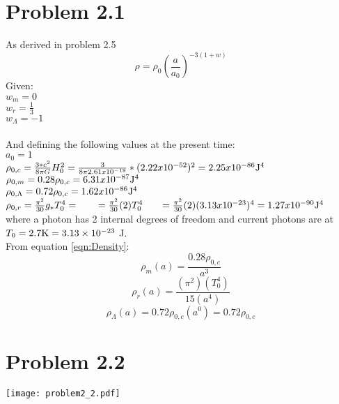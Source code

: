 \documentclass[11pt, oneside, doublespacing]{article}   	%
\begin{document}
\section*{Problem 2.1}
\noindent As derived in problem 2.5 
\begin{equation}
\rho = \rho_{0} \left( \frac{a}{a_{0}}\right) ^{-3(1+w)}
\label{eqn:Density}
\end{equation}
Given: \\
$w_m = 0$ \\
$w_r = \frac{1}{3}$ \\
$w_{\Lambda} = -1$ \\
\\
And defining the following values at the present time: \\
$a_{0} = 1$ \\
$\rho_{0, c} = \frac{3*c^2}{8 \pi G}H_{0}^2 = \frac{3}{8 \pi 2.61x10^{-19}} * (2.22 x 10^{-52})^{2} = 2.25x10^{-86}{\rm J^{4}}$  \\
$\rho_{0, m} = 0.28 \rho_{0, c} = 6.31x10^{-87}{\rm J^{4}}$ \\
$\rho_{0, \Lambda} = 0.72 \rho_{0, c} = 1.62x10^{-86}{\rm J^{4}}$ \\
$\rho_{0, r} = \frac{\pi^2}{30} g_{*} T_{0}^4 = \\
\hspace*{17pt}= \frac{\pi^2}{30} (2) T_{0}^4 \\
\hspace*{17pt}= \frac{\pi^2}{30} (2) (3.13 x 10^{-23})^4 = 1.27x10^{-90}{\rm J^{4}}$\\
where a photon has 2 internal degrees of freedom and current photons are at \\
$T_{0}=2.7{\rm K} = 3.13 \times 10^{-23} $ J. \\

\noindent From equation \ref{eqn:Density}: \\
\begin{equation}
\rho_{m}(a) =  \frac{0.28 \rho_{0, c}}{ a^{3}}
\label{eqn:DensityM}
\end{equation}
\begin{equation}
\rho_{r}(a) = \frac{(\pi^2)(T_{0}^4)}{15 (a^{4})}  
\label{eqn:DensityR}
\end{equation}
\begin{equation}
\rho_{\Lambda}(a) = 0.72 \rho_{0, c} (a^{0}) = 0.72 \rho_{0, c}
\label{eqn:DensityL}
\end{equation}

\section*{Problem 2.2}
\texttt{[image: problem2\_2.pdf]}
\end{document}

